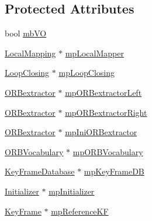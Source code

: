 \subsection*{Protected Attributes}
\begin{DoxyCompactItemize}
\item 
bool \mbox{\hyperlink{class_o_r_b___s_l_a_m2_1_1_tracking_a44ad79261b565797bdf53d503f6defca}{mb\+VO}}
\item 
\mbox{\hyperlink{class_o_r_b___s_l_a_m2_1_1_local_mapping}{Local\+Mapping}} $\ast$ \mbox{\hyperlink{class_o_r_b___s_l_a_m2_1_1_tracking_a83692a6e9626c3c11b329d3b0a35c2f1}{mp\+Local\+Mapper}}
\item 
\mbox{\hyperlink{class_o_r_b___s_l_a_m2_1_1_loop_closing}{Loop\+Closing}} $\ast$ \mbox{\hyperlink{class_o_r_b___s_l_a_m2_1_1_tracking_aed45d56071fcbba3db0552726c897e0d}{mp\+Loop\+Closing}}
\item 
\mbox{\hyperlink{class_o_r_b___s_l_a_m2_1_1_o_r_bextractor}{O\+R\+Bextractor}} $\ast$ \mbox{\hyperlink{class_o_r_b___s_l_a_m2_1_1_tracking_abd41b4020d02e8ca272263964ae400b2}{mp\+O\+R\+Bextractor\+Left}}
\item 
\mbox{\hyperlink{class_o_r_b___s_l_a_m2_1_1_o_r_bextractor}{O\+R\+Bextractor}} $\ast$ \mbox{\hyperlink{class_o_r_b___s_l_a_m2_1_1_tracking_a6eaa5950f4ed2503392ecf240914ddac}{mp\+O\+R\+Bextractor\+Right}}
\item 
\mbox{\hyperlink{class_o_r_b___s_l_a_m2_1_1_o_r_bextractor}{O\+R\+Bextractor}} $\ast$ \mbox{\hyperlink{class_o_r_b___s_l_a_m2_1_1_tracking_a8d25e231894baf85a6a48ab57ce0ddb3}{mp\+Ini\+O\+R\+Bextractor}}
\item 
\mbox{\hyperlink{namespace_o_r_b___s_l_a_m2_a2fafba714858cab1bb18d438e2e83c5d}{O\+R\+B\+Vocabulary}} $\ast$ \mbox{\hyperlink{class_o_r_b___s_l_a_m2_1_1_tracking_a79358a4f15c71538e37e874a5646f43e}{mp\+O\+R\+B\+Vocabulary}}
\item 
\mbox{\hyperlink{class_o_r_b___s_l_a_m2_1_1_key_frame_database}{Key\+Frame\+Database}} $\ast$ \mbox{\hyperlink{class_o_r_b___s_l_a_m2_1_1_tracking_a0ee7e13527e3bb18adb24bc511fd5800}{mp\+Key\+Frame\+DB}}
\item 
\mbox{\hyperlink{class_o_r_b___s_l_a_m2_1_1_initializer}{Initializer}} $\ast$ \mbox{\hyperlink{class_o_r_b___s_l_a_m2_1_1_tracking_a9194420033fe0d556053685844a534be}{mp\+Initializer}}
\item 
\mbox{\hyperlink{class_o_r_b___s_l_a_m2_1_1_key_frame}{Key\+Frame}} $\ast$ \mbox{\hyperlink{class_o_r_b___s_l_a_m2_1_1_tracking_ade9676c7c26eb653beddaa05b37ecc08}{mp\+Reference\+KF}}

\end{DoxyCompactItemize}

